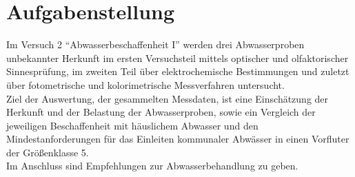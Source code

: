 \chapter{Aufgabenstellung}
\label{sec:aufgabenstellung}

Im Versuch 2 "`Abwasserbeschaffenheit I"' werden drei Abwasserproben unbekannter Herkunft im ersten Versuchsteil mittels optischer und olfaktorischer Sinnesprüfung, im zweiten Teil über elektrochemische Bestimmungen und zuletzt über fotometrische und kolorimetrische Messverfahren  untersucht.\\
Ziel der Auswertung, der gesammelten Messdaten, ist eine Einschätzung der Herkunft und der Belastung der Abwasserproben, sowie ein Vergleich der jeweiligen Beschaffenheit mit häuslichem Abwasser und den Mindestanforderungen für das Einleiten kommunaler Abwässer in einen Vorfluter der Größenklasse 5. \\
Im Anschluss sind Empfehlungen zur Abwasserbehandlung zu geben.